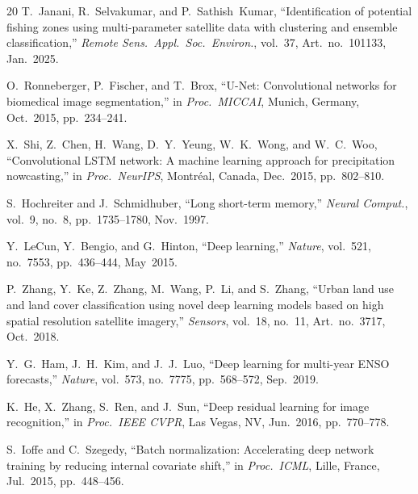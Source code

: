\documentclass[conference]{IEEEtran}
\begin{document}
\begin{thebibliography}{20}
T.~Janani, R.~Selvakumar, and P.~Sathish~Kumar, ``Identification of
potential fishing zones using multi-parameter satellite data with
clustering and ensemble classification,'' \emph{Remote Sens.\ Appl.\
Soc.\ Environ.}, vol.~37, Art.~no.~101133, Jan.~2025.

O.~Ronneberger, P.~Fischer, and T.~Brox, ``U-Net: Convolutional
networks for biomedical image segmentation,'' in \emph{Proc.\ MICCAI},
Munich, Germany, Oct.~2015, pp.~234--241.

X.~Shi, Z.~Chen, H.~Wang, D.~Y.~Yeung, W.~K.~Wong, and W.~C.~Woo,
``Convolutional LSTM network: A machine learning approach for
precipitation nowcasting,'' in \emph{Proc.\ NeurIPS}, Montr\'{e}al,
Canada, Dec.~2015, pp.~802--810.

S.~Hochreiter and J.~Schmidhuber, ``Long short-term memory,''
\emph{Neural Comput.}, vol.~9, no.~8, pp.~1735--1780, Nov.~1997.

Y.~LeCun, Y.~Bengio, and G.~Hinton, ``Deep learning,'' \emph{Nature},
vol.~521, no.~7553, pp.~436--444, May~2015.

P.~Zhang, Y.~Ke, Z.~Zhang, M.~Wang, P.~Li, and S.~Zhang, ``Urban land
use and land cover classification using novel deep learning models
based on high spatial resolution satellite imagery,'' \emph{Sensors},
vol.~18, no.~11, Art.~no.~3717, Oct.~2018.

Y.~G.~Ham, J.~H.~Kim, and J.~J.~Luo, ``Deep learning for multi-year
ENSO forecasts,'' \emph{Nature}, vol.~573, no.~7775, pp.~568--572,
Sep.~2019.

K.~He, X.~Zhang, S.~Ren, and J.~Sun, ``Deep residual learning for
image recognition,'' in \emph{Proc.\ IEEE CVPR}, Las Vegas, NV,
Jun.~2016, pp.~770--778.

S.~Ioffe and C.~Szegedy, ``Batch normalization: Accelerating deep
network training by reducing internal covariate shift,'' in
\emph{Proc.\ ICML}, Lille, France, Jul.~2015, pp.~448--456.

\end{thebibliography}
\end{document}
